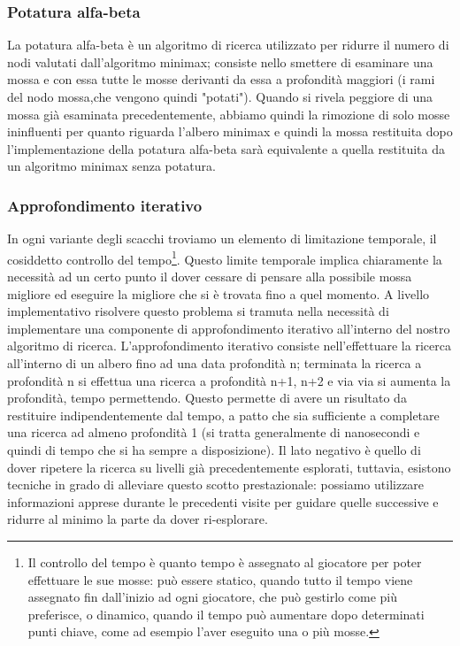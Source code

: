 \subsubsection{Potatura alfa-beta}
La potatura alfa-beta è un algoritmo di ricerca utilizzato per ridurre il numero di nodi valutati dall'algoritmo 
minimax; consiste nello smettere di esaminare una mossa e con essa tutte le mosse derivanti da essa a profondità maggiori
(i rami del nodo mossa,che vengono quindi "potati"). Quando si rivela peggiore di una mossa già esaminata precedentemente,
abbiamo quindi la rimozione di solo mosse ininfluenti per quanto riguarda l'albero minimax e quindi la mossa
restituita dopo l'implementazione della potatura alfa-beta sarà equivalente a quella restituita da un algoritmo
minimax senza potatura.

\subsubsection{Approfondimento iterativo}
In ogni variante degli scacchi troviamo un elemento di limitazione temporale, il cosiddetto controllo del tempo\footnote{Il controllo del tempo è quanto tempo è assegnato al giocatore
per poter effettuare le sue mosse: può essere statico, quando tutto il tempo viene assegnato fin dall'inizio ad ogni giocatore, che può gestirlo come più preferisce, o dinamico, 
quando il tempo può aumentare dopo determinati punti chiave, come ad esempio l'aver eseguito una o più mosse.}.
Questo limite temporale implica chiaramente la necessità ad un certo punto il dover cessare di pensare alla 
possibile mossa migliore ed eseguire la migliore che si è trovata fino a quel momento.
A livello implementativo risolvere questo problema si tramuta nella necessità di implementare una componente di approfondimento
iterativo all'interno del nostro algoritmo di ricerca.
L'approfondimento iterativo consiste nell'effettuare la ricerca all'interno di un albero fino ad una data profondità n;
terminata la ricerca a profondità n si effettua una ricerca a profondità n+1, n+2 e via via si aumenta la profondità, tempo permettendo. Questo permette di avere un risultato da restituire indipendentemente dal tempo, a patto che sia sufficiente a completare una 
ricerca ad almeno profondità 1 (si tratta generalmente di nanosecondi e quindi di tempo che si ha sempre a disposizione). Il lato negativo
è quello di dover ripetere la ricerca su livelli già precedentemente esplorati, tuttavia, esistono tecniche in grado di alleviare questo scotto prestazionale:
possiamo utilizzare informazioni apprese durante le precedenti visite per guidare quelle successive e ridurre al minimo la parte da dover ri-esplorare.
